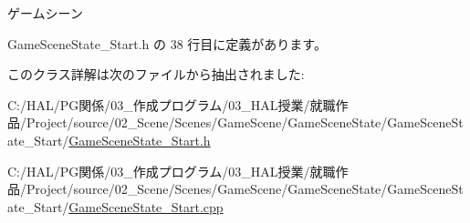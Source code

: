ゲームシーン 



 Game\+Scene\+State\+\_\+\+Start.\+h の 38 行目に定義があります。



このクラス詳解は次のファイルから抽出されました\+:\begin{DoxyCompactItemize}
\item 
C\+:/\+H\+A\+L/\+P\+G関係/03\+\_\+作成プログラム/03\+\_\+\+H\+A\+L授業/就職作品/\+Project/source/02\+\_\+\+Scene/\+Scenes/\+Game\+Scene/\+Game\+Scene\+State/\+Game\+Scene\+State\+\_\+\+Start/\mbox{\hyperlink{_game_scene_state___start_8h}{Game\+Scene\+State\+\_\+\+Start.\+h}}\item 
C\+:/\+H\+A\+L/\+P\+G関係/03\+\_\+作成プログラム/03\+\_\+\+H\+A\+L授業/就職作品/\+Project/source/02\+\_\+\+Scene/\+Scenes/\+Game\+Scene/\+Game\+Scene\+State/\+Game\+Scene\+State\+\_\+\+Start/\mbox{\hyperlink{_game_scene_state___start_8cpp}{Game\+Scene\+State\+\_\+\+Start.\+cpp}}\end{DoxyCompactItemize}
